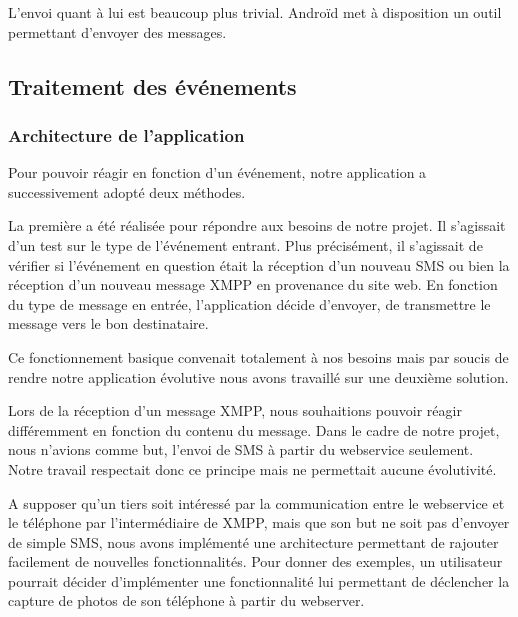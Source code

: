 L'envoi quant à lui est beaucoup plus trivial. Androïd met à disposition un outil permettant d'envoyer
des messages.
\\
 
 
 
\subsection{Traitement des événements}
 
\subsubsection{Architecture de l'application}
 
Pour pouvoir réagir en fonction d'un événement, notre application a successivement adopté deux méthodes.
 
La première a été réalisée pour répondre aux besoins de notre projet. Il s'agissait d'un test sur le 
type de l’événement entrant. Plus précisément, il s'agissait de vérifier si l’événement en question 
était la réception d'un nouveau SMS ou bien la réception d'un nouveau message XMPP en provenance du 
site web. En fonction du type de message en entrée, l'application décide d'envoyer, de  transmettre le message
vers le bon destinataire. 
 
Ce fonctionnement basique convenait totalement à nos besoins mais par soucis de rendre notre application
évolutive nous avons travaillé sur une deuxième solution.
 
Lors de la réception d'un message XMPP, nous souhaitions pouvoir réagir différemment en fonction du contenu
du message. Dans le cadre de notre projet, nous n'avions comme but, l'envoi de SMS à partir du webservice
seulement. Notre travail respectait donc ce principe mais ne permettait aucune évolutivité.
 
A supposer qu'un tiers soit intéressé par la communication entre le webservice et le téléphone par 
l'intermédiaire de XMPP, mais que son but ne soit pas d'envoyer de simple SMS, nous avons implémenté une
architecture permettant de rajouter facilement de nouvelles fonctionnalités. Pour donner des exemples, 
un utilisateur pourrait décider d'implémenter une fonctionnalité lui permettant de déclencher la capture
de photos de son téléphone à partir du webserver.
 

